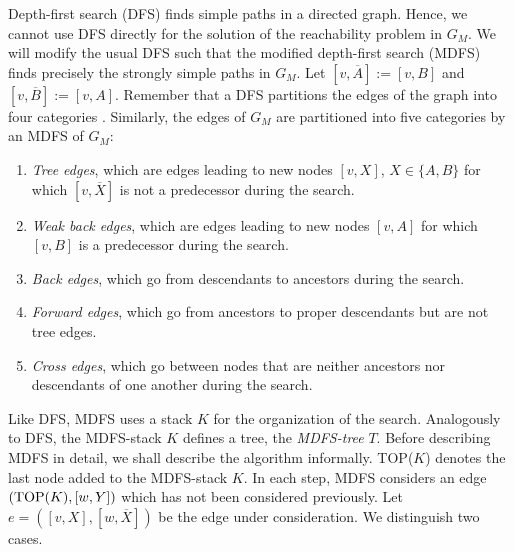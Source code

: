 \documentclass[12pt,twoside,a4paper]{article}
\begin{document}
Depth-first search (DFS) finds simple paths in a directed graph. Hence, we 
cannot
use DFS directly for the solution of the reachability problem in $G_M$. We will
modify the usual DFS such that the modified depth-first search (MDFS) finds
precisely the strongly simple paths in $G_M$.
Let $[v,\overline{A}] := [v,B]$ and $[v,\overline{B}] := [v,A]$. Remember that
a DFS partitions the edges of the graph into four categories \cite{AHU}.
Similarly, the edges of $G_M$ are partitioned into five categories by an
MDFS of $G_M$:
\begin{enumerate}
\item {\em Tree edges\/}, which are edges leading to new nodes $[v,X]$,
$X\in \{A,B\}$ for which
$[v,\overline{X}]$ is not a predecessor during the search.
\item {\em Weak back edges\/}, which are edges leading to new nodes $[v,A]$ for
which $[v,B]$ is a predecessor during the search.
\item {\em Back edges\/}, which go from descendants to ancestors during the 
search.
\item {\em Forward edges\/}, which go from ancestors to proper descendants but
are not tree edges.
\item {\em Cross edges\/}, which go between nodes that are neither ancestors
nor descendants of one another during the search.
\end{enumerate}
Like DFS, MDFS uses a stack $K$ for the organization of the search. Analogously
to DFS, the MDFS-stack $K$ defines a tree, the {\em MDFS-tree} $T$. Before
describing MDFS in detail, we shall describe the algorithm informally. TOP($K$)
denotes the last node added to the MDFS-stack $K$. In each step, MDFS considers
an edge $({\rm TOP}(K), [w,Y])$ which has not been considered previously.
Let $e=([v,X],[w,\overline{X}])$ be the edge under consideration. We 
distinguish two cases.
\end{document}
